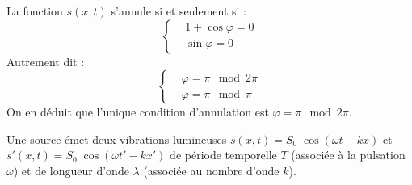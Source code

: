 \reponse{\reponseC{}}

\begin{corrige}
	La fonction $s\left(x,t\right)$ s'annule si et seulement si :
	\begin{equation*}
		\begin{cases}
		& 1+ \cos \varphi = 0 \\
		& \sin \varphi = 0
		\end{cases}
	\end{equation*}
Autrement dit :
\begin{equation*}
	\begin{cases}
		& \varphi = \pi \mod 2\pi \\
		& \varphi = \pi \mod \pi
	\end{cases}
\end{equation*}
	On en déduit que l'unique condition d'annulation est $\varphi = \pi \mod 2\pi$.
\end{corrige}


\finEntrainement


\newpage

\hauteurLargeurCadreReponse		{8mm}{1.5cm}
\initialisationEntrainement


\debutEntrainement



Une source émet deux vibrations lumineuses $s\left(x,t\right)=S_0 \; \cos \left(\omega t - k x\right)$ et $s'\left(x,t\right)=S_0 \; \cos \left(\omega t' - k x'\right)$ de période temporelle $T$ (associée à la pulsation $\omega$) et de longueur d'onde $\lambda$ (associée au nombre d'onde $k$).

